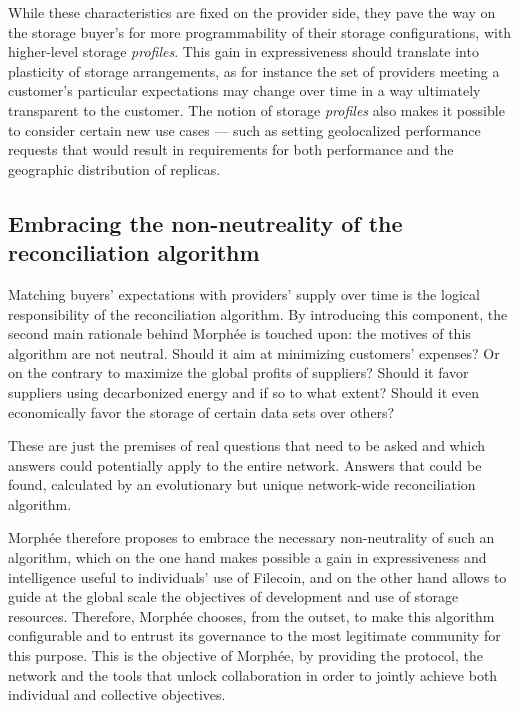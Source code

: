 \documentclass[twoside,twocolumn]{article}
\begin{document}
While these characteristics are fixed on the provider side, they pave the way on the storage buyer's for more
programmability of their storage configurations, with higher-level storage \emph{profiles}.
This gain in expressiveness should translate into plasticity of storage arrangements,
as for instance the set of providers meeting a customer's particular expectations may change over time in a way
ultimately transparent to the customer.
The notion of storage \emph{profiles} also makes it possible to consider certain new use cases
— such as setting geolocalized performance requests that would result in requirements for both performance
and the geographic distribution of replicas.

\subsection{Embracing the non-neutreality of the reconciliation algorithm}

Matching buyers' expectations with providers' supply over time is the logical responsibility of the reconciliation algorithm.
By introducing this component, the second main rationale behind Morphée is touched upon: the motives of this algorithm are not neutral.
Should it aim at minimizing customers' expenses?
Or on the contrary to maximize the global profits of suppliers?
Should it favor suppliers using decarbonized energy and if so to what extent?
Should it even economically favor the storage of certain data sets over others?

These are just the premises of real questions that need to be asked
and which answers could potentially apply to the entire network.
Answers that could be found, calculated by an evolutionary but unique network-wide reconciliation algorithm.

Morphée therefore proposes to embrace the necessary non-neutrality of such an algorithm,
which on the one hand makes possible a gain in expressiveness and intelligence useful to individuals' use of Filecoin,
and on the other hand allows to guide at the global scale the objectives of development and use of storage resources.
Therefore, Morphée chooses, from the outset, to make this algorithm configurable and to entrust its governance to the most legitimate community for this purpose.
This is the objective of Morphée, by providing the protocol, the network and the tools that unlock collaboration in order to jointly achieve both individual and collective objectives.
\end{document}
